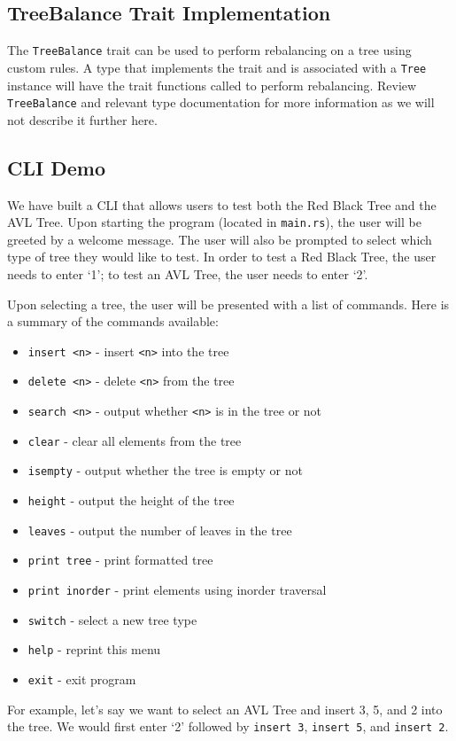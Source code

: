 \documentclass[11pt, letterpaper]{article}
\begin{document}
\subsection{TreeBalance Trait Implementation}
The \texttt{TreeBalance} trait can be used to perform rebalancing on a tree using custom rules.
A type that implements the trait and is associated with a \texttt{Tree} instance will have the trait functions called
to perform rebalancing.  Review \texttt{TreeBalance} and relevant type documentation for more information as we will not
describe it further here.

\subsection{CLI Demo}
We have built a CLI that allows users to test both the Red Black Tree and the AVL Tree. Upon starting the program (located in \texttt{main.rs}), the user will be greeted by a welcome message. The user will also be prompted to select which type of tree they would like to test. In order to test a Red Black Tree, the user needs to enter `1'; to test an AVL Tree, the user needs to enter `2'. 

Upon selecting a tree, the user will be presented with a list of commands. Here is a summary of the commands available:
\begin{itemize}
    \item \texttt{insert <n>}     - insert \texttt{<n>} into the tree
    \item \texttt{delete <n>}     - delete \texttt{<n>} from the tree
    \item \texttt{search <n>}     - output whether \texttt{<n>} is in the tree or not
    \item \texttt{clear}          - clear all elements from the tree
    \item \texttt{isempty}        - output whether the tree is empty or not
    \item \texttt{height}         - output the height of the tree
    \item \texttt{leaves}         - output the number of leaves in the tree
    \item \texttt{print tree}     - print formatted tree
    \item \texttt{print inorder}  - print elements using inorder traversal
    \item \texttt{switch}         - select a new tree type
    \item \texttt{help}           - reprint this menu
    \item \texttt{exit}           - exit program
\end{itemize}

For example, let's say we want to select an AVL Tree and insert 3, 5, and 2 into the tree. We would first enter `2' followed by \texttt{insert 3}, \texttt{insert 5}, and \texttt{insert 2}.
\end{document}
